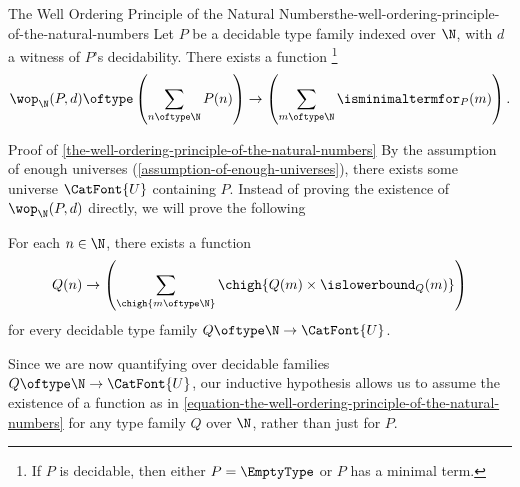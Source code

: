 \begin{theorem}{The Well Ordering Principle of the Natural Numbers}{the-well-ordering-principle-of-the-natural-numbers}%
    Let $P$ be a decidable type family indexed over $\N$, with $d$ a witness of $P$'s decidability. There exists a function%
    \footnote{%
        If $P$ is decidable, then either $P=\EmptyType$ or $P$ has a minimal term.
        \par\vspace*{\TCBBoxCorrection}
    }%
    \[
        \wop_{\N}(P,d)%
        \oftype%
        \left(\sum_{n\oftype\N}P(n)\right)%
        \to%
        \left(\sum_{m\oftype\N}\isminimaltermfor_{P}(m)\right).%
    \]%
\end{theorem}
\begin{Proof}{Proof of \cref{the-well-ordering-principle-of-the-natural-numbers}}%
    By the assumption of enough universes (\cref{assumption-of-enough-universes}), there exists some universe $\CatFont{U}$ containing $P$. Instead of proving the existence of $\wop_{\N}(P,d)$ directly, we will prove the following
    \begin{itemize}
        \itemstar For each $n\in\N$, there exists a function
            \begin{equation}\label{equation-the-well-ordering-principle-of-the-natural-numbers}
                Q(n)%
                \to%
                \left(\sum_{\chigh{m\oftype\N}}\chigh{Q(m)\times\islowerbound_{Q}(m)}\right)%
            \end{equation}
            for every decidable type family $Q\oftype\N\to\CatFont{U}$.
    \end{itemize}
    Since we are now quantifying over decidable families $Q\oftype\N\to\CatFont{U}$, our inductive hypothesis allows us to assume the existence of a function as in \cref{equation-the-well-ordering-principle-of-the-natural-numbers} for any type family $Q$ over $\N$, rather than just for $P$.


\end{Proof}
